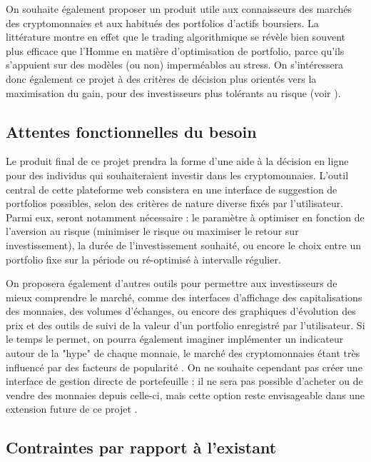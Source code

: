 \documentclass[a4paper]{article}
\begin{document}
On souhaite également proposer un produit utile aux connaisseurs des marchés des cryptomonnaies et aux habitués des portfolios d'actifs boursiers. La littérature \cite{Chaboud2014} montre en effet que le trading algorithmique se révèle bien souvent plus efficace que l'Homme en matière d'optimisation de portfolio, parce qu'ils s'appuient sur des modèles (ou non) imperméables au stress. On s'intéressera donc également ce projet à des critères de décision plus orientés vers la maximisation du gain, pour des investisseurs plus tolérants au risque (voir \cite{Li2014}).

\subsection{Attentes fonctionnelles du besoin}

Le produit final de ce projet prendra la forme d'une aide à la décision en ligne pour des individus qui souhaiteraient investir dans les cryptomonnaies. L'outil central de cette plateforme web consistera en une interface de suggestion de portfolios possibles, selon des critères de nature diverse fixés par l'utilisateur. Parmi eux, seront notamment nécessaire : le paramètre à optimiser en fonction de l'aversion au risque (minimiser le risque ou maximiser le retour sur investissement), la durée de l'investissement souhaité, ou encore le choix entre un portfolio fixe sur la période ou ré-optimisé à intervalle régulier.

On proposera également d'autres outils pour permettre aux investisseurs de mieux comprendre le marché, comme des interfaces d'affichage des capitalisations des monnaies, des volumes d'échanges, ou encore des graphiques d'évolution des prix et des outils de suivi de la valeur d'un portfolio enregistré par l'utilisateur. Si le temps le permet, on pourra également imaginer implémenter un indicateur autour de la "hype" de chaque monnaie, le marché des cryptomonnaies étant très influencé par des facteurs de popularité \cite{Colianni2015}. On ne souhaite cependant pas créer une interface de gestion directe de portefeuille : il ne sera pas possible d'acheter ou de vendre des monnaies depuis celle-ci, mais cette option  reste envisageable dans une extension future de ce projet \cite{Madan2014}.

\subsection{Contraintes par rapport à l'existant}
\end{document}
